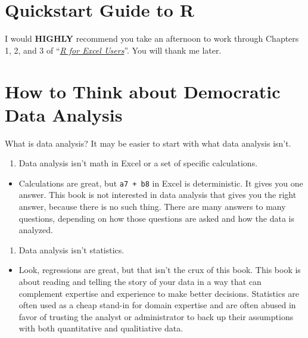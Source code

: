 \documentclass[]{book}
\providecommand{\tightlist}{%
  \setlength{\itemsep}{0pt}\setlength{\parskip}{0pt}}
\begin{document}
\section{Quickstart Guide to R}\label{quickstart-guide-to-r}

I would \textbf{HIGHLY} recommend you take an afternoon to work through
Chapters 1, 2, and 3 of
``\href{https://rstudio-conf-2020.github.io/r-for-excel/index.html}{\emph{R
for Excel Users}}''. You will thank me later.

\section{How to Think about Democratic Data
Analysis}\label{how-to-think-about-democratic-data-analysis}

What is data analysis? It may be easier to start with what data analysis
isn't.

\begin{enumerate}
\def\labelenumi{\arabic{enumi}.}
\tightlist
\item
  Data analysis isn't math in Excel or a set of specific calculations.
\end{enumerate}

\begin{itemize}
\tightlist
\item
  Calculations are great, but \texttt{a7\ +\ b8} in Excel is
  deterministic. It gives you one answer. This book is not interested in
  data analysis that gives you the right answer, because there is no
  such thing. There are many answers to many questions, depending on how
  those questions are asked and how the data is analyzed.
\end{itemize}

\begin{enumerate}
\def\labelenumi{\arabic{enumi}.}
\setcounter{enumi}{1}
\tightlist
\item
  Data analysis isn't statistics.
\end{enumerate}

\begin{itemize}
\tightlist
\item
  Look, regressions are great, but that isn't the crux of this book.
  This book is about reading and telling the story of your data in a way
  that can complement expertise and experience to make better decisions.
  Statistics are often used as a cheap stand-in for domain expertise and
  are often abused in favor of trusting the analyst or administrator to
  back up their assumptions with both quantitative and qualitiative
  data.
\end{itemize}
\end{document}
